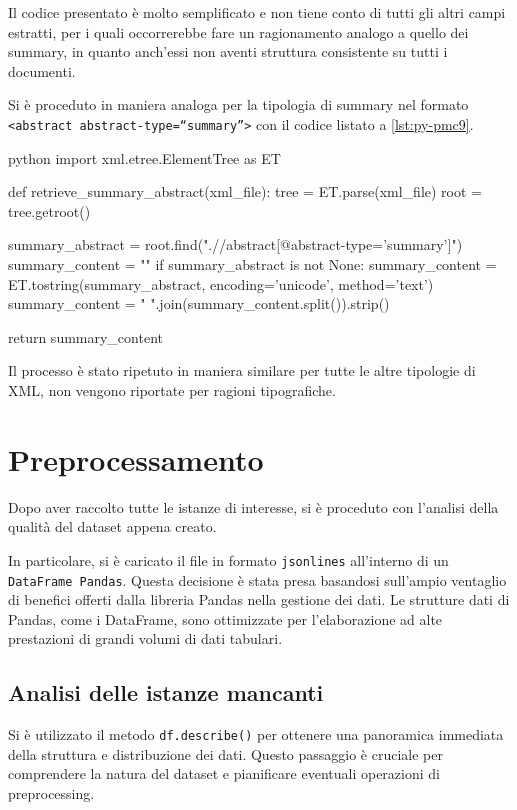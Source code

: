 \documentclass[12pt,a4paper,twoside,openright]{book}
\begin{document}
Il codice presentato è molto semplificato e non tiene conto di tutti gli altri campi estratti, per i quali occorrerebbe fare un ragionamento analogo a quello dei summary, in quanto anch'essi non aventi struttura consistente su tutti i documenti.

Si è proceduto in maniera analoga per la tipologia di summary nel formato \texttt{<abstract abstract-type=``summary''>} con il codice listato a \ref{lst:py-pmc9}.

\begin{customcode}
\begin{mintedbox}{python}
import xml.etree.ElementTree as ET

def retrieve_summary_abstract(xml_file):
    tree = ET.parse(xml_file)
    root = tree.getroot()

    summary_abstract = root.find(".//abstract[@abstract-type='summary']")
    summary_content = ""
    if summary_abstract is not None:
        summary_content = ET.tostring(summary_abstract, encoding='unicode', method='text')
        summary_content = " ".join(summary_content.split()).strip() 

    return summary_content
\end{mintedbox}
\caption{Python script per estrarre l'abstract di tipo `summary'.}
\label{lst:py-pmc9}
\end{customcode}

Il processo è stato ripetuto in maniera similare per tutte le altre tipologie di XML, non vengono riportate per ragioni tipografiche.

\section{Preprocessamento}

Dopo aver raccolto tutte le istanze di interesse, si è proceduto con l'analisi della qualità del dataset appena creato.

In particolare, si è caricato il file in formato \texttt{jsonlines} all'interno di un \texttt{DataFrame Pandas}. Questa decisione è stata presa basandosi sull'ampio ventaglio di benefici offerti dalla libreria Pandas nella gestione dei dati. Le strutture dati di Pandas, come i DataFrame, sono ottimizzate per l'elaborazione ad alte prestazioni di grandi volumi di dati tabulari.


\subsection{Analisi delle istanze mancanti}
Si è utilizzato il metodo \texttt{df.describe()} per ottenere una panoramica immediata della struttura e distribuzione dei dati. Questo passaggio è cruciale per comprendere la natura del dataset e pianificare eventuali operazioni di preprocessing.
\end{document}
